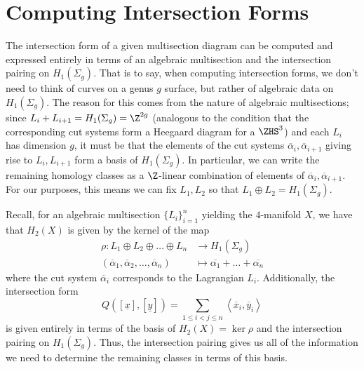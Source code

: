 \section{Computing Intersection Forms}

The intersection form of a given multisection diagram can be computed and expressed entirely in terms of an algebraic multisection and the intersection pairing on $H_1(\Sigma_g)$. That is to say, when computing intersection forms, we don't need to think of curves on a genus $g$ surface, but rather of algebraic data on $H_1(\Sigma_g)$. The reason for this comes from the nature of algebraic multisections; since $L_i + L_{i + 1} = H_1(\Sigma_g) = \Z^{2g}$ (analogous to the condition that the corresponding cut systems form a Heegaard diagram for a $\ZHS^3$) and each $L_i$ has dimension $g$, it must be that the elements of the cut systems $\overline{\alpha}_i, \overline{\alpha}_{i + 1}$ giving rise to $L_i,L_{i + 1}$ form a basis of $H_1(\Sigma_g)$. In particular, we can write the remaining homology classes as a $\Z$-linear combination of elements of $\overline{\alpha}_i, \overline{\alpha}_{i + 1}$. For our purposes, this means we can fix $L_1,L_2$ so that $L_1 \oplus L_2 = H_1(\Sigma_g)$.

Recall, for an algebraic multisection $\{L_i\}_{i = 1}^n$ yielding the $4$-manifold $X$, we have that $H_2(X)$ is given by the kernel of the map 
\begin{align*}
	\rho: L_1 \oplus L_2 \oplus \dots \oplus L_n &\to H_1(\Sigma_g)\\
	(\overline{\alpha}_1, \overline{\alpha}_2, \dots, \overline{\alpha}_n) &\mapsto \overline{\alpha_1} + \dots + \overline{\alpha_n}
\end{align*} 
where the cut system $\overline{\alpha}_i$ corresponds to the Lagrangian $L_i$. Additionally, the intersection form \[Q([\underline{x}],[\underline{y}]) = \sum_{1 \leq i < j \leq n} \left< \overline{x}_i, \overline{y}_i \right>\] is given entirely in terms of the basis of $H_2(X) = \ker\rho$ and the intersection pairing on $H_1(\Sigma_g)$. Thus, the intersection pairing gives us all of the information we need to determine the remaining classes in terms of this basis.


